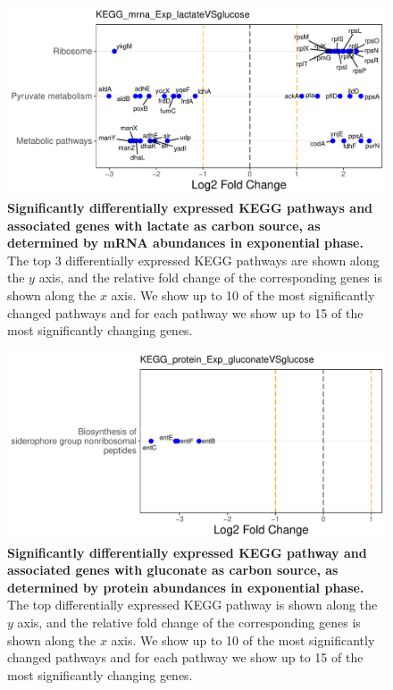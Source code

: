 \documentclass[a4paper]{article}
\begin{document}
\clearpage
\begin{figure}
	\includegraphics[width=1.0\textwidth]{../../d_figures/KEGG03_mrna_Exp_lactateVSglucose_withTitle.pdf}
	\caption[Significantly differentially expressed KEGG pathways for mRNA samples in exponential phase tested for lactate against glucose]
	{\textbf{Significantly differentially expressed KEGG pathways and associated genes with lactate as carbon source, as determined by mRNA abundances in exponential phase.} The top 3 differentially expressed KEGG pathways are shown along the $y$ axis, and the relative fold change of the corresponding genes is shown along the $x$ axis. We show up to 10 of the most significantly changed pathways and for each pathway we show up to 15 of the most significantly changing genes.}
\end{figure}

\clearpage
\begin{figure}
	\includegraphics[width=1.0\textwidth]{../../d_figures/KEGG04_protein_Exp_gluconateVSglucose_withTitle.pdf}
	\caption[Significantly differentially expressed KEGG pathway for protein samples in exponential phase tested for gluconate against glucose]
	{\textbf{Significantly differentially expressed KEGG pathway and associated genes with gluconate as carbon source, as determined by protein abundances in exponential phase.} The top differentially expressed KEGG pathway is shown along the $y$ axis, and the relative fold change of the corresponding genes is shown along the $x$ axis. We show up to 10 of the most significantly changed pathways and for each pathway we show up to 15 of the most significantly changing genes.}
\end{figure}
\end{document}
